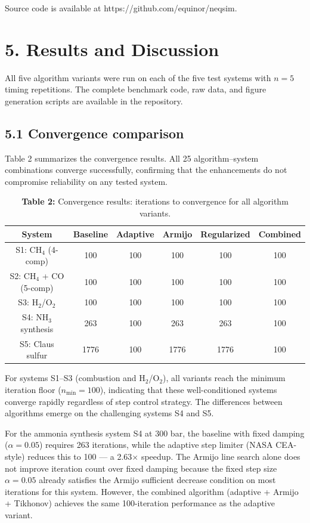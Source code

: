 \documentclass[review,3p]{elsarticle}
\begin{document}
Source code is available at https://github.com/equinor/neqsim.


\section{5. Results and Discussion}

All five algorithm variants were run on each of the five test systems with $n = 5$ timing repetitions. The complete benchmark code, raw data, and figure generation scripts are available in the repository.

\subsection{5.1 Convergence comparison}

Table 2 summarizes the convergence results. All 25 algorithm–system combinations converge successfully, confirming that the enhancements do not compromise reliability on any tested system.


\begin{table}[htbp]
\centering
\caption{\textbf{Table 2:} Convergence results: iterations to convergence for all algorithm variants.}
\begin{tabular}{cccccc}
\toprule
System & Baseline & Adaptive & Armijo & Regularized & Combined \\
\midrule
S1: CH$_4$ (4-comp) & 100 & 100 & 100 & 100 & 100 \\
S2: CH$_4$ + CO (5-comp) & 100 & 100 & 100 & 100 & 100 \\
S3: H$_2$/O$_2$ & 100 & 100 & 100 & 100 & 100 \\
S4: NH$_3$ synthesis & 263 & 100 & 263 & 263 & 100 \\
S5: Claus sulfur & 1776 & 100 & 1776 & 1776 & 100 \\
\bottomrule
\end{tabular}
\end{table}

For systems S1–S3 (combustion and H$_2$/O$_2$), all variants reach the minimum iteration floor ($n_{\min} = 100$), indicating that these well-conditioned systems converge rapidly regardless of step control strategy. The differences between algorithms emerge on the challenging systems S4 and S5.

For the ammonia synthesis system S4 at 300 bar, the baseline with fixed damping ($\alpha = 0.05$) requires 263 iterations, while the adaptive step limiter (NASA CEA-style) reduces this to 100 — a 2.63$\times$ speedup. The Armijo line search alone does not improve iteration count over fixed damping because the fixed step size $\alpha = 0.05$ already satisfies the Armijo sufficient decrease condition on most iterations for this system. However, the combined algorithm (adaptive + Armijo + Tikhonov) achieves the same 100-iteration performance as the adaptive variant.
\end{document}

